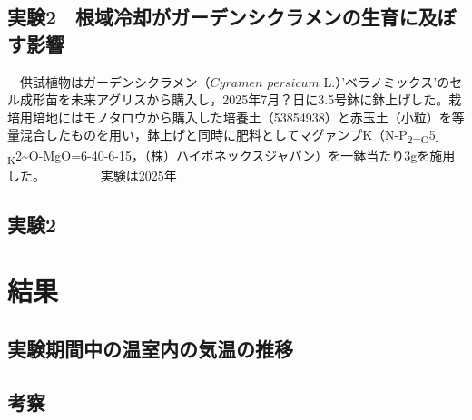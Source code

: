 \documentclass[
  japanese,
  11pt,
  letterpaper,
  DIV=11,
  numbers=noendperiod]{scrartcl}
\begin{document}
\begin{table}[H]

\caption{\label{tbl-well_setting}貯水槽への井戸水の注水開始・停止温度と空気ポンプの作動状況}


\end{table}%

\subsection{実験2　根域冷却がガーデンシクラメンの生育に及ぼす影響}\label{ux5b9fux9a132-ux6839ux57dfux51b7ux5374ux304cux30acux30fcux30c7ux30f3ux30b7ux30afux30e9ux30e1ux30f3ux306eux751fux80b2ux306bux53caux307cux3059ux5f71ux97ff}

　供試植物はガーデンシクラメン（\(Cyramen\) \(persicum\)
L.）'ベラノミックス'のセル成形苗を未来アグリスから購入し，2025年7月？日に3.5号鉢に鉢上げした。栽培用培地にはモノタロウから購入した培養土（53854938）と赤玉土（小粒）を等量混合したものを用い，鉢上げと同時に肥料としてマグァンプK（N-P\textsubscript{2=O}5\textsubscript{-K}2\textasciitilde O-MgO=6-40-6-15，（株）ハイポネックスジャパン）を一鉢当たり3gを施用した。
　 　 　 実験は2025年

\subsection{実験2}\label{ux5b9fux9a132}

\section{結果}\label{ux7d50ux679c}

\subsection{実験期間中の温室内の気温の推移}\label{ux5b9fux9a13ux671fux9593ux4e2dux306eux6e29ux5ba4ux5185ux306eux6c17ux6e29ux306eux63a8ux79fb}

\subsection{考察}\label{ux8003ux5bdf}
\end{document}
